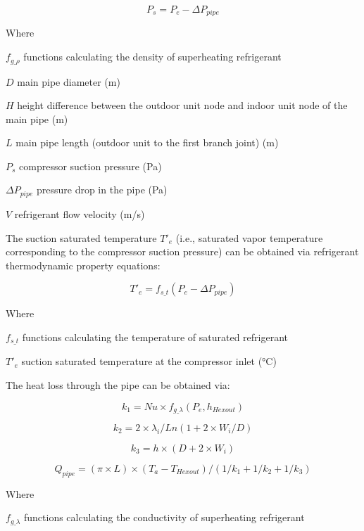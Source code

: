 \begin{equation}
  P_s=P_e-\Delta{P_{pipe}}
\end{equation}

Where

$f_{g\_\rho}$	functions calculating the density of superheating refrigerant 

$D$ main pipe diameter (m) 

$H$ height difference between the outdoor unit node and indoor unit node of the main pipe (m)

$L$ main pipe length (outdoor unit to the first branch joint) (m) 

$P_s$ compressor suction pressure (Pa) 

$\Delta{P_{pipe}}$ pressure drop in the pipe (Pa)

$V$ refrigerant flow velocity (m/s)

The suction saturated temperature $T'_e$ (i.e., saturated vapor temperature corresponding to the compressor suction pressure) can be obtained via refrigerant thermodynamic property equations:

\begin{equation}
  T'_e=f_{s\_t}(P_e-\Delta{P_{pipe}})
\end{equation}

Where

$f_{s\_t}$	functions calculating the temperature of saturated refrigerant

$T'_e$   	suction saturated temperature at the compressor inlet (°C)

The heat loss through the pipe can be obtained via:

\begin{equation}
k_1=Nu\times{f_{g\_\lambda}(P_e,h_{Hexout})}
\end{equation}

\begin{equation}k_2=2\times{\lambda_i}/Ln(1+2\times{W_i}/D)\end{equation}

\begin{equation}k_3=h\times(D+2\times{W_i})\end{equation}

\begin{equation}Q_{pipe}=(\pi\times{L})\times(T_a-T_{Hexout})/(1/k_1+1/k_2+1/k_3)\end{equation}

Where

$f_{g\_\lambda}$	functions calculating the conductivity of superheating refrigerant 

